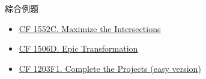 \documentclass[aspectratio=169]{beamer}
\begin{document}
    \begin{frame}{綜合例題}
        \begin{itemize}
            \item \href{https://codeforces.com/contest/1552/problem/C}{CF 1552C. Maximize the Intersections}
            \item \href{C. Maximize the Intersections}{CF 1506D. Epic Transformation}
            \item \href{https://codeforces.com/problemset/problem/1203/F1}{CF 1203F1. Complete the Projects (easy version)}
        \end{itemize}
    \end{frame}
\end{document}
